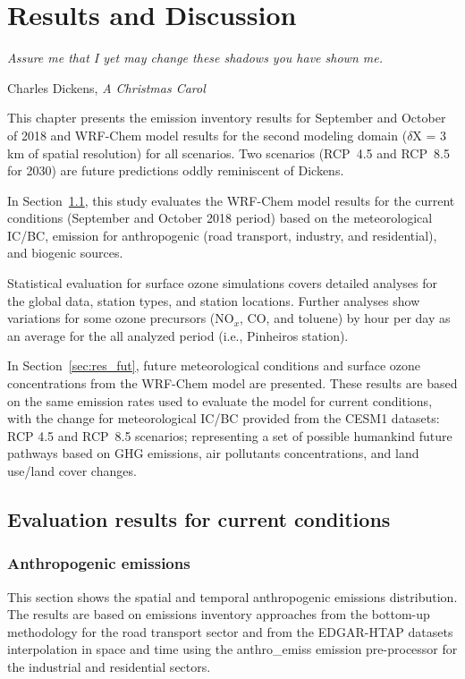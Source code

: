 \chapter{\bf Results and Discussion}\label{chap:resul}
\epigraph{\textit{Assure me that I yet may change these shadows you have shown me.}}{Charles Dickens, \textit{A Christmas Carol}}
   \noindent  This chapter presents the emission inventory results for September and October of 2018 and WRF-Chem model results for the second modeling domain ($\delta$X = 3 km of spatial resolution) for all scenarios.
   Two scenarios (RCP~4.5 and RCP~8.5 for 2030) are future predictions oddly reminiscent of Dickens.
      
   In Section~\ref{sec:res_curr}, this study evaluates the WRF-Chem model results for the current conditions (September and October 2018 period) based on the meteorological IC/BC, emission for anthropogenic (road transport, industry, and residential), and biogenic sources.
   
   Statistical evaluation for surface ozone simulations covers detailed analyses for the global data, station types, and station locations.
   Further analyses show variations for some ozone precursors (NO$_x$, CO, and toluene) by hour per day as an average for the all analyzed period (i.e., Pinheiros station).
   
   In Section~\ref{sec:res_fut}, future meteorological conditions and surface ozone concentrations from the WRF-Chem model are presented. 
   These results are based on the same emission rates used to evaluate the model for current conditions, with the change for meteorological IC/BC provided from the CESM1 datasets: RCP 4.5 and RCP~8.5 scenarios; representing a set of possible humankind future pathways based on GHG emissions, air pollutants concentrations, and land use/land cover changes.   
   
   \section{Evaluation results for current conditions}\label{sec:res_curr}
    
  \subsection{Anthropogenic emissions}\label{subsec:res_anth}
   This section shows the spatial and temporal anthropogenic emissions distribution.
   The results are based on emissions inventory approaches from the bottom-up methodology for the road transport sector \citep{Andrade2015} and from the EDGAR-HTAP datasets \citep{Janssens2015} interpolation in space and time using the anthro\_emiss emission pre-processor \citep{Kumar2020} for the industrial and residential sectors.
   
